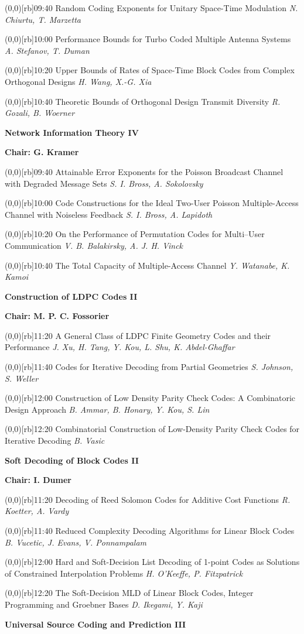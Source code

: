 \documentclass[a5paper,twoside]{article}
\def\period#1{\flushleft{\large\bfseries #1}\markboth{\sf #1}{\sf #1}}
\def\sesstitle#1{\vspace{.45\bigskipamount}\par{\bfseries #1}\par}
\def\sesschair#1{{\bfseries Chair: #1}\par\vspace{.65\medskipamount}}
\def\papertime#1{\makebox(0,0)[rb]{{\scriptsize #1}\hspace{.5em}}}
\def\papertitle#1{#1\hfil\break}
\def\paperauthors#1{{\itshape #1}\par\filbreak\vspace{.65\medskipamount}}
\begin{document}
\papertime{09:40}%
\papertitle{Random Coding Exponents for Unitary Space-Time Modulation}
\paperauthors{N. Chiurtu, T. Marzetta}
\papertime{10:00}%
\papertitle{Performance Bounds for Turbo Coded Multiple Antenna Systems}
\paperauthors{A. Stefanov, T. Duman}
\papertime{10:20}%
\papertitle{Upper Bounds of Rates of Space-Time Block Codes from Complex Orthogonal Designs}
\paperauthors{H. Wang, X.-G. Xia}
\papertime{10:40}%
\papertitle{Theoretic Bounds of Orthogonal Design Transmit Diversity}
\paperauthors{R. Gozali, B. Woerner}
\sesstitle{Network Information Theory IV}
\sesschair{G. Kramer}
\papertime{09:40}%
\papertitle{Attainable Error Exponents for the Poisson Broadcast Channel with Degraded Message Sets}
\paperauthors{S. I. Bross, A. Sokolovsky}
\papertime{10:00}%
\papertitle{Code Constructions for the Ideal Two-User Poisson Multiple-Access Channel with Noiseless Feedback}
\paperauthors{S. I. Bross, A. Lapidoth}
\papertime{10:20}%
\papertitle{On the Performance of Permutation Codes for Multi--User Communication}
\paperauthors{V. B. Balakirsky, A. J. H. Vinck}
\papertime{10:40}%
\papertitle{The Total Capacity of Multiple-Access Channel}
\paperauthors{Y. Watanabe, K. Kamoi}
\period{Thu 11:20 -- 13:00}
\sesstitle{Construction of LDPC Codes II}
\sesschair{M. P. C. Fossorier}
\papertime{11:20}%
\papertitle{A General Class of LDPC Finite Geometry Codes and their Performance}
\paperauthors{J. Xu, H. Tang, Y. Kou, L. Shu, K. Abdel-Ghaffar}
\papertime{11:40}%
\papertitle{Codes for Iterative Decoding from Partial Geometries}
\paperauthors{S. Johnson, S. Weller}
\papertime{12:00}%
\papertitle{Construction of Low Density Parity Check Codes: A Combinatoric Design Approach}
\paperauthors{B. Ammar, B. Honary, Y. Kou, S. Lin}
\papertime{12:20}%
\papertitle{Combinatorial Construction of Low-Density Parity Check Codes for Iterative Decoding}
\paperauthors{B. Vasic}
\sesstitle{Soft Decoding of Block Codes II}
\sesschair{I. Dumer}
\papertime{11:20}%
\papertitle{Decoding of Reed Solomon Codes for Additive Cost Functions}
\paperauthors{R. Koetter, A. Vardy}
\papertime{11:40}%
\papertitle{Reduced Complexity Decoding Algorithms for Linear Block Codes}
\paperauthors{B. Vucetic, J. Evans, V. Ponnampalam}
\papertime{12:00}%
\papertitle{Hard and Soft-Decision List Decoding of 1-point Codes as Solutions of Constrained Interpolation Problems}
\paperauthors{H. O'Keeffe, P. Fitzpatrick}
\papertime{12:20}%
\papertitle{The Soft-Decision MLD of Linear Block Codes, Integer Programming and Groebner Bases}
\paperauthors{D. Ikegami, Y. Kaji}
\sesstitle{Universal Source Coding and Prediction III}
\end{document}
